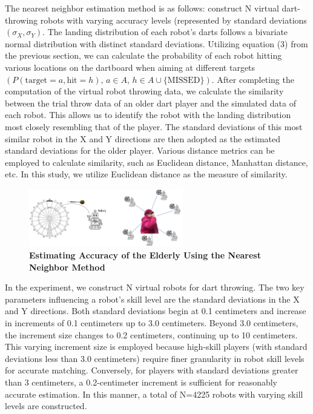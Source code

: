\documentclass[cjjs]{ipart}
\theoremstyle{plain}
\begin{document}
The nearest neighbor estimation method is as follows: construct N virtual dart-throwing robots with varying accuracy levels (represented by standard deviations$(\sigma_X, \sigma_Y)$. The landing distribution of each robot's darts follows a bivariate normal distribution with distinct standard deviations. Utilizing equation (3) from the previous section, we can calculate the probability of each robot hitting various locations on the dartboard when aiming at different targets$\left( P(\text{target}=a, \text{hit}=h),\, a \in A, \, h \in A \cup \{\text{MISSED}\} \right)$. After completing the computation of the virtual robot throwing data, we calculate the similarity between the trial throw data of an older dart player and the simulated data of each robot. This allows us to identify the robot with the landing distribution most closely resembling that of the player. The standard deviations of this most similar robot in the X and Y directions are then adopted as the estimated standard deviations for the older player. Various distance metrics can be employed to calculate similarity, such as Euclidean distance, Manhattan distance, etc. In this study, we utilize Euclidean distance as the measure of similarity.

\begin{figure}[h]
    \centering
    \includegraphics[width=0.60\textwidth]{3.png} 
    \caption{\textbf{Estimating Accuracy
of the Elderly Using the Nearest Neighbor Method}}
    \label{fig:dartboard}
\end{figure}


In the experiment, we construct N virtual robots for dart throwing. The two key parameters influencing a robot's skill level are the standard deviations in the X and Y directions. Both standard deviations begin at 0.1 centimeters and increase in increments of 0.1 centimeters up to 3.0 centimeters. Beyond 3.0 centimeters, the increment size changes to 0.2 centimeters, continuing up to 10 centimeters. This varying increment size is employed because high-skill players (with standard deviations less than 3.0 centimeters) require finer granularity in robot skill levels for accurate matching. Conversely, for players with standard deviations greater than 3 centimeters, a 0.2-centimeter increment is sufficient for reasonably accurate estimation. In this manner, a total of N=4225 robots with varying skill levels are constructed.
\end{document}
